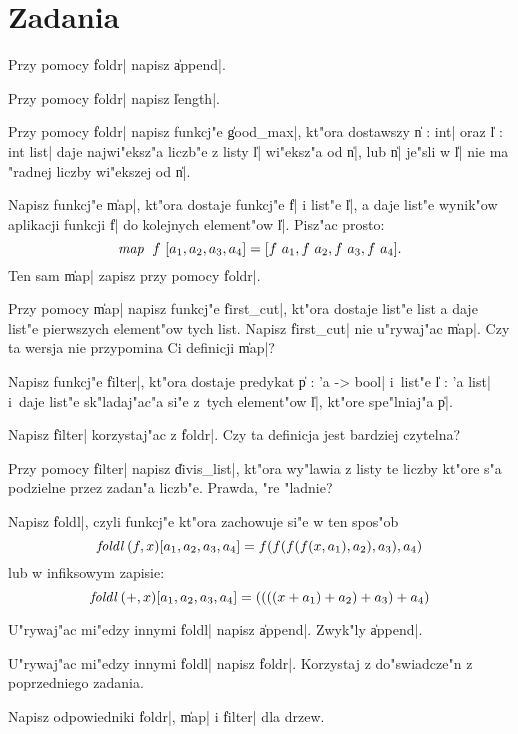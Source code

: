 \section*{Zadania}
\begin{exercises}

\item%
Przy pomocy \|foldr| napisz \|append|.

\item%
Przy pomocy \|foldr| napisz \|length|.

\item%
Przy pomocy \|foldr| napisz funkcj"e \|good_max|, kt"ora dostawszy
\|n : int| oraz \|l : int list| daje najwi"eksz"a liczb"e
z listy \|l| wi"eksz"a od \|n|,
lub \|n| je"sli w \|l| nie ma "radnej liczby wi"ekszej od \|n|.

\item%
Napisz funkcj"e \|map|, kt"ora dostaje funkcj"e \|f| i list"e \|l|,
a daje list"e wynik"ow aplikacji funkcji \|f| do kolejnych element"ow  \|l|.
Pisz"ac prosto:
$$\f{map}\ f\ [a_1, a_2, a_3, a_4] = [f\ a_1, f\ a_2, f\ a_3, f\ a_4].$$
Ten sam \|map| zapisz przy pomocy \|foldr|.

\item%
Przy pomocy \|map| napisz funkcj"e \|first_cut|, kt"ora dostaje
list"e list a daje list"e pierwszych element"ow tych list.
Napisz \|first_cut| nie u"rywaj"ac \|map|. 
Czy ta wersja nie przypomina Ci definicji \|map|?

\item%
Napisz funkcj"e \|filter|, kt"ora dostaje predykat \|p : 'a -> bool|
i~list"e \|l : 'a list| i~daje list"e sk"ladaj"ac"a si"e z~tych element"ow
\|l|, kt"ore spe"lniaj"a \|p|.

Napisz \|filter| korzystaj"ac z \|foldr|.
Czy ta definicja jest bardziej czytelna?

\item%
Przy pomocy \|filter| napisz \|divis_list|, kt"ora wy"lawia
z listy te liczby kt"ore s"a podzielne przez zadan"a liczb"e.
Prawda, "re "ladnie?

\item%
Napisz \|foldl|, czyli funkcj"e kt"ora zachowuje si"e w ten spos"ob
$$\f{foldl} (f, x) [a_1, a_2, a_3, a_4] = f(f(f(f(x, a_1), a_2), a_3), a_4)$$
lub w infiksowym zapisie:
$$\f{foldl} (+, x) [a_1, a_2, a_3, a_4] = ((((x + a_1) + a_2) + a_3) + a_4)$$

\item%
U"rywaj"ac mi"edzy innymi \|foldl| napisz \|append|.
Zwyk"ly \|append|. 
 
\item%
U"rywaj"ac mi"edzy innymi \|foldl| napisz \|foldr|.
Korzystaj z do"swiadcze"n z poprzedniego zadania.

\item%
Napisz odpowiedniki \|foldr|, \|map| i \|filter| dla drzew.

\end{exercises}


